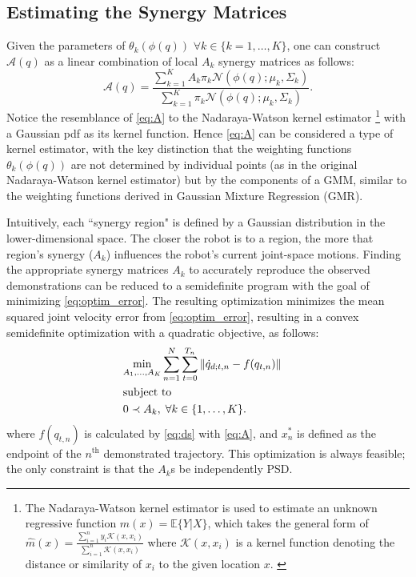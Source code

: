 \documentclass[letterpaper, 10 pt, journal, twoside, fleqn]{IEEEtran}
\begin{document}
\subsection{Estimating the Synergy Matrices}
Given the parameters of $\theta_k(\phi(q))$ $\forall k \in \{k=1,\dots,K\}$, one can construct $\mathcal{A}(q)$ as a linear combination of local $A_k$ synergy matrices as follows: 
\begin{equation}
\label{eq:A}
\mathcal{A}(q) = \frac{\sum_{k=1}^K A_k \pi_k\mathcal{N}(\phi(q); \mu_k, \Sigma_k)}{\sum_{k=1}^K \pi_k\mathcal{N} (\phi(q); \mu_k, \Sigma_k)}.
\end{equation} 
Notice the resemblance of \eqref{eq:A} to the Nadaraya-Watson kernel estimator \cite{nadaraya1964regress,watson1964regress}\footnote{The Nadaraya-Watson kernel estimator is used to estimate an unknown regressive function $m(x) = \mathbb{E}\{Y|X\}$, which takes the general form of $\widehat{m}(x) = \frac{\sum_{i=1}^n y_i \mathcal{K}(x,x_i)}{\sum_{i=1}^n \mathcal{K}(x,x_i)}$ where $\mathcal{K}(x,x_i)$ is a kernel function denoting the distance or similarity of $x_i$ to the given location $x$. \cite{nadaraya1964regress,watson1964regress}} with a Gaussian pdf as its kernel function. Hence \eqref{eq:A} can be considered a type of kernel estimator, with the key distinction that the weighting functions $\theta_k(\phi(q))$ are not determined by individual points (as in the original Nadaraya-Watson kernel estimator) but by the components of a GMM, similar to the weighting functions derived in Gaussian Mixture Regression (GMR). 

Intuitively, each ``synergy region" is defined by a Gaussian distribution in the lower-dimensional space. The closer the robot is to a region, the more that region's synergy ($A_k$) influences the robot's current joint-space motions. Finding the appropriate synergy matrices $A_k$ to accurately reproduce the observed demonstrations can be reduced to a semidefinite program with the goal of minimizing \eqref{eq:optim_error}. The resulting optimization minimizes the mean squared joint velocity error from \eqref{eq:optim_error}, resulting in a convex semidefinite optimization with a quadratic objective, as follows:
\begin{equation}
\vspace{-10pt}
\begin{aligned}
&\underset{A_1, \dots, A_K}{\text{min}} 
\sum_{n=1}^N\sum_{t=0}^{T_n} \left \| \dot{q}_{d;t,n} - f(q_{t,n}) \right \| \\
& \text{subject to}&\\
&  0 \prec A_k, \; \forall k \in \{1, \dots, K\}. &
\end{aligned}
\label{eq:opt}
\end{equation}
where $f(q_{t,n})$ is calculated by %
 \eqref{eq:ds} with \eqref{eq:A}, and $x^*_{n}$ is defined as the endpoint of the $ n^{\text{th}} $ demonstrated trajectory. This optimization is always feasible; the only constraint is that the $A_k$s be independently PSD.
\end{document}
